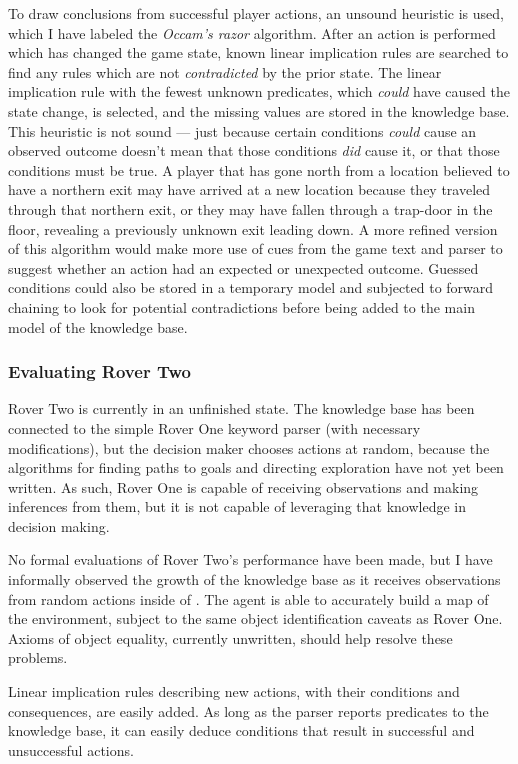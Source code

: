To draw conclusions from successful player actions, an unsound heuristic
is used, which I have labeled the \emph{Occam's razor} algorithm. After
an action is performed which has changed the game state, known linear
implication rules are searched to find any rules which are not
\emph{contradicted} by the prior state. The linear implication rule with
the fewest unknown predicates, which \emph{could} have caused the state
change, is selected, and the missing values are stored in the knowledge
base. This heuristic is not sound --- just because certain conditions
\emph{could} cause an observed outcome doesn't mean that those
conditions \emph{did} cause it, or that those conditions must be true. A
player that has gone north from a location believed to have a northern
exit may have arrived at a new location because they traveled through
that northern exit, or they may have fallen through a trap-door in the
floor, revealing a previously unknown exit leading down. A more refined
version of this algorithm would make more use of cues from the game text
and parser to suggest whether an action had an expected or unexpected
outcome. Guessed conditions could also be stored in a temporary model
and subjected to forward chaining to look for potential contradictions
before being added to the main model of the knowledge base.

\subsubsection{Evaluating Rover Two}

Rover Two is currently in an unfinished state. The knowledge base has
been connected to the simple Rover One keyword parser (with necessary
modifications), but the decision maker chooses actions at random,
because the algorithms for finding paths to goals and directing
exploration have not yet been written. As such, Rover One is capable of
receiving observations and making inferences from them, but it is not
capable of leveraging that knowledge in decision making.

No formal evaluations of Rover Two's performance have been made, but I
have informally observed the growth of the knowledge base as it receives
observations from random actions inside of . The agent is
able to accurately build a map of the environment, subject to the same
object identification caveats as Rover One. Axioms of object equality,
currently unwritten, should help resolve these problems.

Linear implication rules describing new actions, with their conditions
and consequences, are easily added. As long as the parser reports
predicates to the knowledge base, it can easily deduce conditions that
result in successful and unsuccessful actions.

